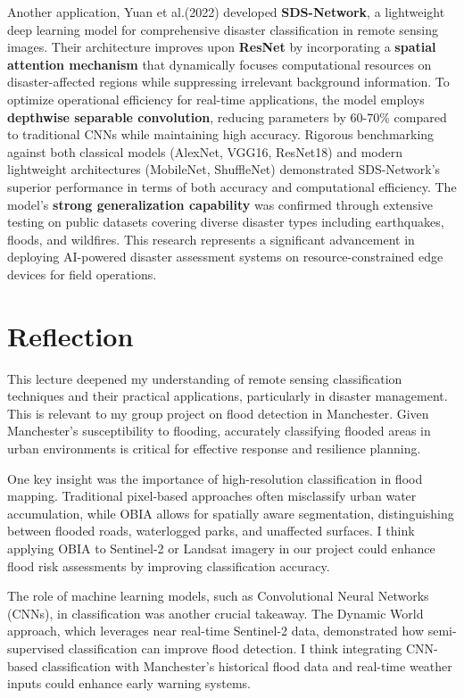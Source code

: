 \documentclass[
  letterpaper,
]{scrbook}
\begin{document}
Another application, Yuan et al.(2022) developed \textbf{SDS-Network}, a
lightweight deep learning model for comprehensive disaster
classification in remote sensing images. Their architecture improves
upon \textbf{ResNet} by incorporating a \textbf{spatial attention
mechanism} that dynamically focuses computational resources on
disaster-affected regions while suppressing irrelevant background
information. To optimize operational efficiency for real-time
applications, the model employs \textbf{depthwise separable
convolution}, reducing parameters by 60-70\% compared to traditional
CNNs while maintaining high accuracy. Rigorous benchmarking against both
classical models (AlexNet, VGG16, ResNet18) and modern lightweight
architectures (MobileNet, ShuffleNet) demonstrated SDS-Network's
superior performance in terms of both accuracy and computational
efficiency. The model's \textbf{strong generalization capability} was
confirmed through extensive testing on public datasets covering diverse
disaster types including earthquakes, floods, and wildfires. This
research represents a significant advancement in deploying AI-powered
disaster assessment systems on resource-constrained edge devices for
field operations.

\section{Reflection}\label{reflection-5}

This lecture deepened my understanding of remote sensing classification
techniques and their practical applications, particularly in disaster
management. This is relevant to my group project on flood detection in
Manchester. Given Manchester's susceptibility to flooding, accurately
classifying flooded areas in urban environments is critical for
effective response and resilience planning.

One key insight was the importance of high-resolution classification in
flood mapping. Traditional pixel-based approaches often misclassify
urban water accumulation, while OBIA allows for spatially aware
segmentation, distinguishing between flooded roads, waterlogged parks,
and unaffected surfaces. I think applying OBIA to Sentinel-2 or Landsat
imagery in our project could enhance flood risk assessments by improving
classification accuracy.

The role of machine learning models, such as Convolutional Neural
Networks (CNNs), in classification was another crucial takeaway. The
Dynamic World approach, which leverages near real-time Sentinel-2 data,
demonstrated how semi-supervised classification can improve flood
detection. I think integrating CNN-based classification with
Manchester's historical flood data and real-time weather inputs could
enhance early warning systems.
\end{document}
